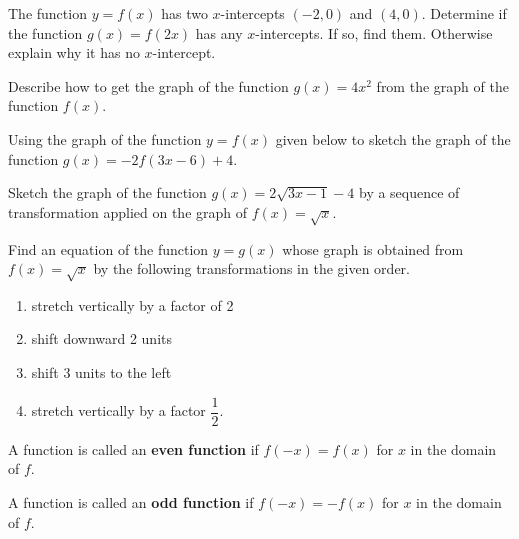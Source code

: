 \begin{example}
  The function $y=f(x)$ has two $x$-intercepts $(-2, 0)$ and $(4, 0)$. Determine if the function $g(x)=f(2x)$ has any $x$-intercepts. If so, find them. Otherwise explain why it has no $x$-intercept.
\end{example}

\begin{example}
  Describe how to get the graph of the function $g(x)=4x^2$ from the graph of the function $f(x)$.
\end{example}
\newpage

\begin{example}
  Using the graph of the function $y=f(x)$ given below to sketch the graph of the function $g(x)=-2f(3x-6)+4$.\\

\end{example}

\newpage

\begin{example}
Sketch the graph of the function $g(x)=2\sqrt{3x-1}-4$ by a sequence of transformation applied on the graph of $f(x)=\sqrt{x}$.  
\end{example}

\begin{example}
  Find an equation of the function $y=g(x)$ whose graph is obtained from $f(x)=\sqrt{x}$ by the following transformations in the given order.
  \begin{enumerate}
    \item stretch vertically by a factor of 2
    \item shift downward 2 units
    \item shift 3 units to the left
    \item stretch vertically by a factor $\dfrac{1}{2}$.
  \end{enumerate}
\end{example}

\newpage

\begin{definition}
  A function is called an \textbf{even function} if $f(-x)=f(x)$ for $x$ in the domain of $f$.
  
  A function is called an \textbf{odd function} if $f(-x)=-f(x)$ for $x$ in the domain of $f$.
\end{definition}

